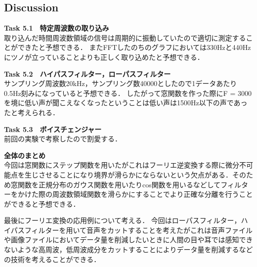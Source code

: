 \documentclass[11pt, a4paper,twocolumn]{jarticle}
\begin{document}
\subsection{Discussion}
\noindent
\textbf{Task 5.1　特定周波数の取り込み} \\
取り込んだ時間周波数領域の信号は周期的に振動していたので適切に測定することができたと予想できる．
またFFTしたのちのグラフにおいては330Hzと440Hzにツノが立っていることよりも正しく取り込めたと予想できる．

\noindent
\textbf{Task 5.2　ハイパスフィルター，ローパスフィルター} \\
サンプリング周波数20kHz，サンプリング数40000としたので1データあたり0.5Hz刻みになっていると予想できる．
したがって窓関数を作った際にF = 3000を境に低い声が聞こえなくなったということは低い声は1500Hz以下の声であったと考えられる．

\noindent
\textbf{Task 5.3　ボイスチェンジャー} \\
前回の実験で考察したので割愛する．

\noindent
\textbf{全体のまとめ} \\
今回は窓関数にステップ関数を用いたがこれはフーリエ逆変換する際に微分不可能点を生じさせることになり境界が滑らかにならないという欠点がある．そのため窓関数を正規分布のガウス関数を用いたりcos関数を用いるなどしてフィルターをかけた際の周波数領域関数を滑らかにすることでより正確な分離を行うことができると予想できる．

最後にフーリエ変換の応用例について考える．
今回はローパスフィルター，ハイパスフィルターを用いて音声をカットすることを考えたがこれは音声ファイルや画像ファイルにおいてデータ量を削減したいときに人間の目や耳では感知できないような高周波，低周波成分をカットすることによりデータ量を削減するなどの技術を考えることができる．
\newpage
\end{document}
